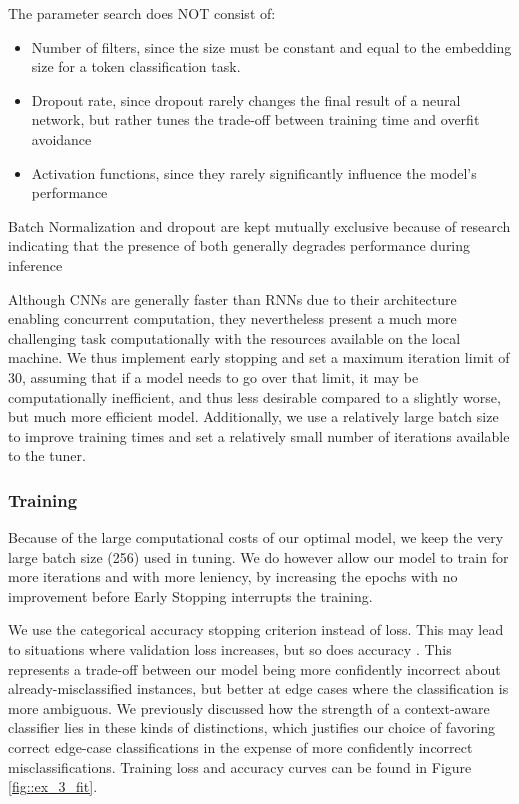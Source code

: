 \documentclass[10pt, a4paper]{article}
\begin{document}
	
	The parameter search does NOT consist of:
	\begin{itemize}
		\item Number of filters, since the size must be constant and equal to the embedding size for a token classification task.
		\item Dropout rate, since dropout rarely changes the final result of a neural network, but rather tunes the trade-off between training time and overfit avoidance
		\item Activation functions, since they rarely significantly influence the model's performance
	\end{itemize}
	
	Batch Normalization and dropout are kept mutually exclusive because of research indicating that the presence of both generally degrades performance during inference \cite{dropout-norm}
	
	Although CNNs are generally faster than RNNs due to their architecture enabling concurrent computation, they nevertheless present a much more challenging task computationally with the resources available on the local machine. We thus implement early stopping and set a maximum iteration limit of $30$, assuming that if a model needs to go over that limit, it may be computationally inefficient, and thus less desirable compared to a slightly worse, but much more efficient model. Additionally, we use a relatively large batch size to improve training times and set a relatively small number of iterations available to the tuner.
	
	
	\subsubsection{Training}
	
	Because of the large computational costs of our optimal model, we keep the very large batch size (256) used in tuning. We do however allow our model to train for more iterations and with more leniency, by increasing the epochs with no improvement before Early Stopping interrupts the training.
	
	We use the categorical accuracy stopping criterion instead of loss. This may lead to situations where validation loss increases, but so does accuracy \cite{loss-accuracy}. This represents a trade-off between our model being more confidently incorrect about already-misclassified instances, but better at edge cases where the classification is more ambiguous. We previously discussed how the strength of a context-aware classifier lies in these kinds of distinctions, which justifies our choice of favoring correct edge-case classifications in the expense of more confidently incorrect misclassifications. Training loss and accuracy curves can be found in Figure \ref{fig::ex_3_fit}.
	
\end{document}
